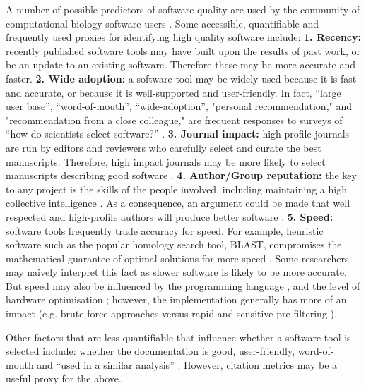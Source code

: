 \documentclass[fleqn,10pt]{SelfArx} %
\begin{document}
A number of possible predictors of software quality are used by the
community of computational biology software users \cite{Hannay2009-cf,Joppa2013-vj,Loman2015-bw}. Some accessible,
quantifiable and frequently used proxies for identifying high quality
software include: \textbf{1. Recency:} recently published software
tools may have built upon the results of past work, or be an update to
an existing software. Therefore these may be more accurate and
faster. \textbf{2. Wide adoption:} a software tool may be widely used
because it is fast and accurate, or because it is well-supported and
user-friendly. In fact, “large user base”, “word-of-mouth”,
“wide-adoption”, "personal recommendation," and "recommendation from a
close colleague," are frequent responses to surveys of “how do
scientists select software?”
\cite{Hannay2009-cf,Joppa2013-vj,Loman2015-bw}. \textbf{3. Journal
  impact:} high profile journals are run by editors and reviewers who
carefully select and curate the best manuscripts. Therefore, high
impact journals may be more likely to select manuscripts describing
good software \cite{Garfield1955-wf}. \textbf{4. Author/Group
  reputation:} the key to any project is the skills of the people
involved, including maintaining a high collective intelligence
\cite{Joppa2013-vj,Woolley2010-ld,Cheruvelil2014-xn}. As a
consequence, an argument could be made that well respected and
high-profile authors will produce better software
\cite{Hirsch2005-mt,Bornmann2008-il}. \textbf{5. Speed:} software tools
frequently trade accuracy for speed. For example, heuristic
software such as the popular homology search tool, BLAST, compromises
the mathematical guarantee of optimal solutions for more speed
\cite{Altschul1990-ht,Altschul1997-ga}. Some researchers may naively
interpret this fact as slower software is likely to be more
accurate. But speed may also be influenced by the programming language
\cite{Fourment2008-vl}, and the level of hardware optimisation
\cite{Farrar2007-ky,Dematte2010-ph};
however, the implementation generally has more of an impact (e.g. brute-force approaches versus
rapid and sensitive pre-filtering
\cite{Schaeffer1989-mu,Papadimitriou_undated-bo}).

Other factors that are less quantifiable that influence whether a
software tool is selected include: whether the documentation is good,
user-friendly, word-of-mouth and ``used in a similar analysis''
\cite{Loman2015-bw}. However, citation metrics may be a
useful proxy for the above.
\end{document}
